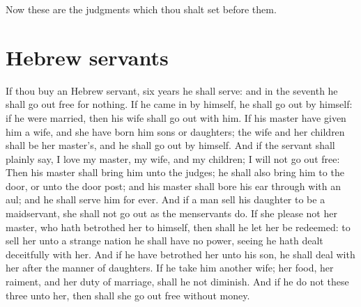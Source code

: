 \begin{biblechapter} %
\verse Now these are the judgments which thou shalt set before them.
\section*{Hebrew servants}
\verse If thou buy an Hebrew servant, six years he shall serve: and in the seventh he shall go out free for nothing.
\verse If he came in by himself, he shall go out by himself: if he were married, then his wife shall go out with him.
\verse If his master have given him a wife, and she have born him sons or daughters; the wife and her children shall be her master's, and he shall go out by himself.
\verse And if the servant shall plainly say, I love my master, my wife, and my children; I will not go out free:
\verse Then his master shall bring him unto the judges; he shall also bring him to the door, or unto the door post; and his master shall bore his ear through with an aul; and he shall serve him for ever.
\verse And if a man sell his daughter to be a maidservant, she shall not go out as the menservants do.
\verse If she please not her master, who hath betrothed her to himself, then shall he let her be redeemed: to sell her unto a strange nation he shall have no power, seeing he hath dealt deceitfully with her.
\verse And if he have betrothed her unto his son, he shall deal with her after the manner of daughters.
\verse If he take him another wife; her food, her raiment, and her duty of marriage, shall he not diminish.
\verse And if he do not these three unto her, then shall she go out free without money.

\end{biblechapter}

